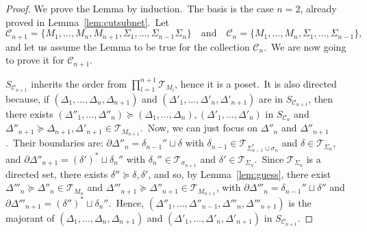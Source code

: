 \documentclass[11pt]{article}
\newcommand{\del}{\partial}
\theoremstyle{definition}
\numberwithin{equation}{section}
\begin{document}
\begin{proof}
We prove the Lemma by induction.~The basis is the case $n=2$, already proved in Lemma~\ref{lem:cutsubnet}.~Let
\[\mathscr{C}_{n+1}=\{M_1,\dots,M_n,M_{n+1},\Sigma_1,\dots,\Sigma_{n-1}\Sigma_n\}\quad\text{and}\quad\mathscr{C}_n=\{M_1,\dots,M_{n},\Sigma_1,\dots,\Sigma_{n-1}\},\] and let us assume the Lemma to be true for the collection $\mathscr{C}_n$.~We are now going to prove it for $\mathscr{C}_{n+1}$.

$S_{\mathscr{C}_{n+1}}$ inherits the order from $\prod_{l=1}^{n+1}\mathcal{T}_{M_l}$, hence it is a poset.~It is also directed because, if $(\Delta_1,\dots,\Delta_n,\Delta_{n+1})$ and $(\Delta'_1,\dots,\Delta'_n,\Delta'_{n+1})$ are in $S_{\mathscr C_{n+1}}$, then there exists $(\Delta''_1,\dots,\Delta''_n)\succeq(\Delta_1,\dots,\Delta_n),(\Delta'_1,\dots,\Delta'_n)$ in $S_{\mathscr{C}_{n}}$ and $\Delta''_{n+1}\succeq\Delta_{n+1},\Delta'_{n+1}\in\mathcal{T}_{M_{n+1}}$.~Now, we can just focus on $\Delta''_n$ and $\Delta''_{n+1}$.~Their boundaries are: $\del\Delta''_n=\delta_{n-1}''\sqcup\delta$ with $\delta_{n-1}\in\mathcal{T}_{\Sigma^*_{n-1}\sqcup\sigma_n}$ and $\delta\in\mathcal{T}_{\Sigma_{n}}$, and $\del\Delta''_{n+1}=(\delta')^*\sqcup\delta_{n}''$ with $\delta_n''\in\mathcal{T}_{\sigma_{n+1}}$ and $\delta'\in\mathcal{T}_{\Sigma_{n}}$.~Since $\mathcal{T}_{\Sigma_n}$ is a directed set, there exists $\delta''\succeq\delta,\delta'$, and so, by Lemma~\ref{lem:guess}, there exist $\Delta'''_n\succeq\Delta''_n\in\mathcal{T}_{M_{n}}$ and $\Delta'''_{n+1}\succeq\Delta''_{n+1}\in\mathcal{T}_{M_{n+1}}$, with $\del\Delta'''_n=\delta_{n-1}''\sqcup\delta''$ and $\del\Delta'''_{n+1}=(\delta'')^*\sqcup\delta_{n}''$.~Hence, $(\Delta''_1,\dots,\Delta''_{n-1},\Delta'''_{n},\Delta'''_{n+1})$ is the majorant of $(\Delta_1,\dots,\Delta_n,\Delta_{n+1})$ and $(\Delta'_1,\dots,\Delta'_n,\Delta'_{n+1})$ in $S_{\mathscr{C}_{n+1}}$.
\smallskip


\end{proof}
\end{document}
